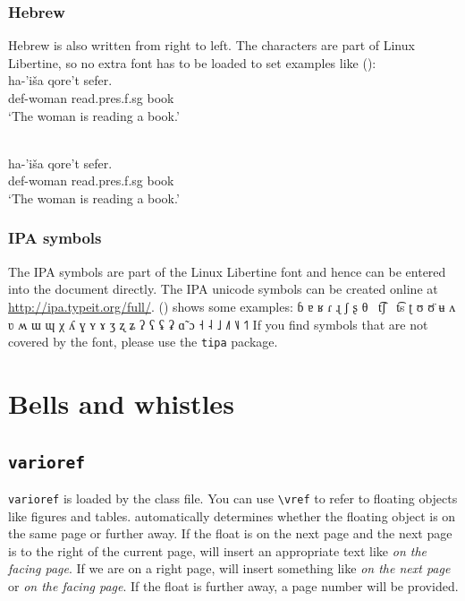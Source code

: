 \subsubsection{Hebrew}

Hebrew is also written from right to left. The characters are part of Linux Libertine, so no extra
font has to be loaded to set examples like ():
\ea
{}\\
\gll   ha-'iša          qore't                            sefer.\\
       {\sc def}-woman  read.{\sc pres}.{\sc f}.{\sc sg}  book\\
\glt `The woman is reading a book.'
\z
\begin{fitverb}
\ea
{}\\
\gll   ha-'iša          qore't                            sefer.\\
       {\sc def}-woman  read.{\sc pres}.{\sc f}.{\sc sg}  book\\
\glt `The woman is reading a book.'
\z
\end{fitverb}

\subsubsection{IPA symbols}

The IPA symbols are part of the Linux Libertine font and hence can be entered into the document
directly. The IPA unicode symbols can be created online at
\url{http://ipa.typeit.org/full/}. () shows some examples:
\ea
ɓ ɐ ʁ ɾ ɻ ʃ ʂ θ~  t͡ʃ~  t͡s  ʈ ʊ ʊ̈ ʉ ʌ ʋ ʍ ɯ ɰ χ ʎ ɣ ʏ ɤ ʒ ʐ ʑ ʔ ʕ ʢ ʡ ɑ̃ ɔ ˧ ˨ ˩ ˩˥ ˥˩ ˦˥
\z
If you find symbols that are not covered by the font, please use the \texttt{tipa} package.

\section{Bells and whistles}

\subsection{\texttt{varioref}}

\texttt{varioref} is loaded by the \lsp class file. You can use \verb+\vref+ to refer to floating
objects like figures and tables. \latex automatically determines whether the floating object is on
the same page or further away. If the float is on the next page and the next page is to the right of
the current page, \latex will insert an appropriate text like \emph{on the facing page}. If we are
on a right page, \latex will insert something like \emph{on the next page} or \emph{on the facing page}. If the float is further
away, a page number will be provided.

